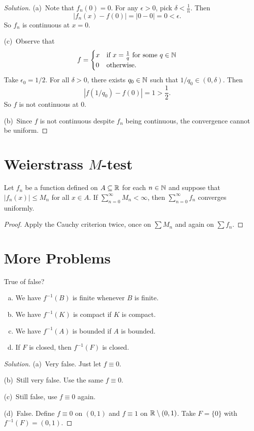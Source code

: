 \begin{proof}[Solution]
  (a)\, Note that $f_n(0) = 0$. For any
  $\epsilon > 0$, pick $\delta < \frac{1}{n}$.
  Then
  \[
    |f_n(x) - f(0)| = |0 - 0| = 0 < \epsilon.
  \]
  So $f_n$ is continuous at $x = 0$.

  (c)\, Observe that
  \[
    f = \begin{cases}
      x & \text{if } x = \frac{1}{q} \text{ for some } q \in \mathbb{N} \\
      0 & \text{otherwise}.
    \end{cases}
  \]
  Take $\epsilon_0 = 1 / 2$. For all $\delta > 0$,
  there exists $q_0 \in \mathbb{N}$ such that
  $1 / q_0 \in (0, \delta)$. Then
  \[
    \left|f(1 / q_0) - f(0)\right| = 1 > \frac{1}{2}.
  \]
  So $f$ is not continuous at $0$.

  (b)\, Since $f$ is not continuous despite
  $f_n$ being continuous, the convergence cannot be
  uniform.
\end{proof}

\section{Weierstrass \texorpdfstring{$M$}{M}-test}

\begin{corollary}
  Let $f_n$ be a function defined on $A \subseteq \mathbb{R}$
  for each $n \in \mathbb{N}$ and suppose that
  $|f_n(x)| \le M_n$ for all $x \in A$.
  If $\sum_{n = 0}^\infty M_n < \infty$, then
  $\sum_{n = 0}^\infty f_n$ converges uniformly.
\end{corollary}

\begin{proof}
  Apply the Cauchy criterion twice, once on $\sum M_n$
  and again on $\sum f_n$.
\end{proof}

\section{More Problems}

\begin{exercise}
  True of false?
  \begin{enumerate}[(a)]
    \item We have $f^{-1}(B)$ is finite whenever $B$ is finite.
    \item We have $f^{-1}(K)$ is compact if
      $K$ is compact.
    \item We have $f^{-1}(A)$ is bounded if $A$ is bounded.
    \item If $F$ is closed, then $f^{-1}(F)$ is closed.
  \end{enumerate}
\end{exercise}

\begin{proof}[Solution]
  (a)\, Very false. Just let $f \equiv 0$.

  (b)\, Still very false. Use the same $f \equiv 0$.

  (c)\, Still false, use $f \equiv 0$ again.

  (d)\, False. Define $f \equiv 0$ on $(0, 1)$ and
  $f \equiv 1$ on $\mathbb{R} \setminus (0, 1)$.
  Take $F = \{0\}$ with $f^{-1}(F) = (0, 1)$.
\end{proof}
